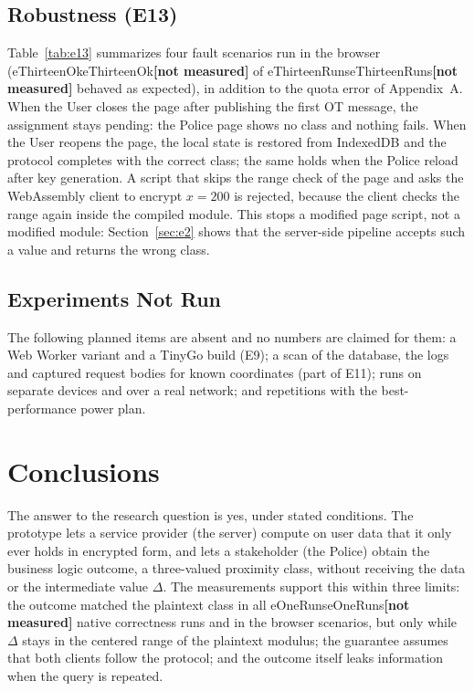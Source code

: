 \documentclass[conference,letterpaper]{IEEEtran}
\newcommand{\num}[1]{\ifcsname #1\endcsname\csname #1\endcsname\else\textbf{[not measured]}\fi}
\newcommand{\tabin}[1]{\IfFileExists{generated/#1}{\resizebox{\ifdim\width>\columnwidth\columnwidth\else\width\fi}{!}{}}{\textbf{[not measured]}}}
\begin{document}
\subsection{Robustness (E13)}
Table~\ref{tab:e13} summarizes four fault scenarios run in the browser (\num{eThirteenOk} of \num{eThirteenRuns} behaved as expected), in addition to the quota error of Appendix~A. When the User closes the page after publishing the first OT message, the assignment stays pending: the Police page shows no class and nothing fails. When the User reopens the page, the local state is restored from IndexedDB and the protocol completes with the correct class; the same holds when the Police reload after key generation. A script that skips the range check of the page and asks the WebAssembly client to encrypt $x = 200$ is rejected, because the client checks the range again inside the compiled module. This stops a modified page script, not a modified module: Section~\ref{sec:e2} shows that the server-side pipeline accepts such a value and returns the wrong class.

\begin{table}[t]
\caption{Robustness scenarios in the browser (E13).}
\label{tab:e13}
\centering\scriptsize
\tabin{tab_e13.tex}
\end{table}

\subsection{Experiments Not Run}
The following planned items are absent and no numbers are claimed for them: a Web Worker variant and a TinyGo build (E9); a scan of the database, the logs and captured request bodies for known coordinates (part of E11); runs on separate devices and over a real network; and repetitions with the best-performance power plan.
\section{Conclusions}
The answer to the research question is yes, under stated conditions. The prototype lets a service provider (the server) compute on user data that it only ever holds in encrypted form, and lets a stakeholder (the Police) obtain the business logic outcome, a three-valued proximity class, without receiving the data or the intermediate value $\Delta$. The measurements support this within three limits: the outcome matched the plaintext class in all \num{eOneRuns} native correctness runs and in the browser scenarios, but only while $\Delta$ stays in the centered range of the plaintext modulus; the guarantee assumes that both clients follow the protocol; and the outcome itself leaks information when the query is repeated.
\end{document}
